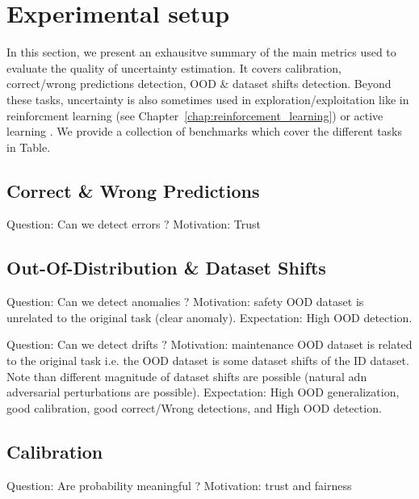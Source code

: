 
\section{Experimental setup}

In this section, we present an exhausitve summary of the main metrics used to evaluate the quality of uncertainty estimation. 
It covers calibration, correct/wrong predictions detection, OOD \& dataset shifts detection.
Beyond these tasks, uncertainty is also sometimes used in exploration/exploitation like in reinforcment learning (see Chapter~\ref{chap:reinforcement_learning}) or active learning .
We provide a collection of benchmarks which cover the different tasks in Table.~


\subsection{Correct \& Wrong Predictions}

Question: Can we detect errors ?
Motivation: Trust

\subsection{Out-Of-Distribution \& Dataset Shifts}

Question: Can we detect anomalies ?
Motivation: safety
OOD dataset is unrelated to the original task (clear anomaly). Expectation: High OOD detection.

Question: Can we detect drifts ?
Motivation: maintenance
OOD dataset is related to the original task i.e. the OOD dataset is some dataset shifts of the ID dataset. Note than different magnitude of dataset shifts are possible (natural adn adversarial perturbations are possible). Expectation: High OOD generalization, good calibration, good correct/Wrong detections, and High OOD detection.

\subsection{Calibration}

Question: Are probability meaningful ?
Motivation: trust and fairness